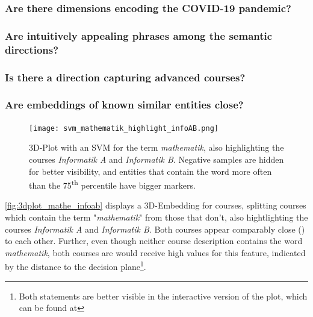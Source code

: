 
\subsubsection{Are there dimensions encoding the COVID-19 pandemic?}


\subsubsection{Are intuitively appealing phrases among the semantic directions?}


\subsubsection{Is there a direction capturing advanced courses?}


\subsubsection{Are embeddings of known similar entities close?}

\begin{figure}[H]
	\centering
	\texttt{[image: svm\_mathematik\_highlight\_infoAB.png]}
	\caption[3D-Plot with an SVM for the term \textit{mathematik}]{
		\label{fig:3dplot_mathe_infoab}
		3D-Plot with an SVM for the term \textit{mathematik}, also highlighting the courses \textit{Informatik A} and \textit{Informatik B}. Negative samples are hidden for better visibility, and entities that contain the word more often than the 75\textsuperscript{th} percentile have bigger markers.
	}
\end{figure}

\autoref{fig:3dplot_mathe_infoab} displays a 3D-Embedding for courses, splitting courses which contain the term "\textit{mathematik}" from those that don't, also hightlighting the courses \textit{Informatik A} and \textit{Informatik B}. Both courses appear comparably close () to each other. Further, even though neither course description contains the word \textit{mathematik}, both courses are would receive high values for this feature, indicated by the distance to the decision plane\footnote{Both statements are better visible in the interactive version of the plot, which can be found at }.

